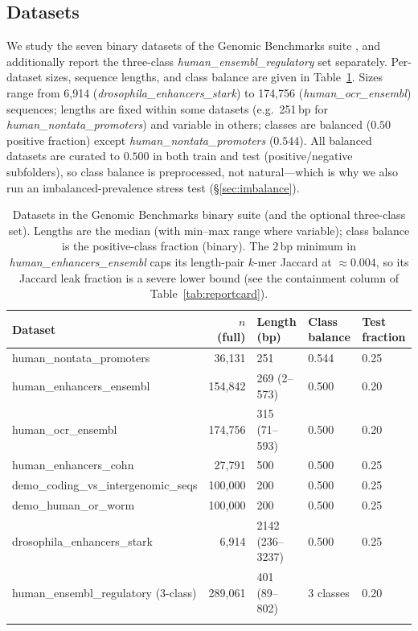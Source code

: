 \documentclass[webpdf,modern,large,namedate]{oup-authoring-template}%
\begin{document}
\subsection{Datasets}
We study the seven binary datasets of the Genomic Benchmarks suite \citep{gresova2023}, and additionally report the three-class \textit{human\_ensembl\_regulatory} set separately. Per-dataset sizes, sequence lengths, and class balance are given in Table~\ref{tab:datasets}. Sizes range from 6{,}914 (\textit{drosophila\_enhancers\_stark}) to 174{,}756 (\textit{human\_ocr\_ensembl}) sequences; lengths are fixed within some datasets (e.g.\ 251\,bp for \textit{human\_nontata\_promoters}) and variable in others; classes are balanced ($0.50$ positive fraction) except \textit{human\_nontata\_promoters} ($0.544$). All balanced datasets are curated to $0.500$ in both train and test (positive/negative subfolders), so class balance is preprocessed, not natural---which is why we also run an imbalanced-prevalence stress test (\S\ref{sec:imbalance}).

\begin{table}[tbp]
\begin{center}
\begin{minipage}{\textwidth}
\caption{Datasets in the Genomic Benchmarks binary suite (and the optional three-class set). Lengths are the median (with min--max range where variable); class balance is the positive-class fraction (binary). The $2$\,bp minimum in \textit{human\_enhancers\_ensembl} caps its length-pair $k$-mer Jaccard at $\approx0.004$, so its Jaccard leak fraction is a severe lower bound (see the containment column of Table~\ref{tab:reportcard}).\label{tab:datasets}}

\footnotesize\setlength{\tabcolsep}{5pt}\begin{tabular}{@{}lrlll@{}}
\toprule
Dataset & $n$ (full) & Length (bp) & Class balance & Test fraction\\
\midrule
human\_nontata\_promoters          & 36{,}131  & 251              & 0.544 & 0.25\\
human\_enhancers\_ensembl          & 154{,}842 & 269 (2--573)     & 0.500 & 0.20\\
human\_ocr\_ensembl                & 174{,}756 & 315 (71--593)    & 0.500 & 0.20\\
human\_enhancers\_cohn             & 27{,}791  & 500              & 0.500 & 0.25\\
demo\_coding\_vs\_intergenomic\_seqs & 100{,}000 & 200              & 0.500 & 0.25\\
demo\_human\_or\_worm               & 100{,}000 & 200              & 0.500 & 0.25\\
drosophila\_enhancers\_stark       & 6{,}914   & 2142 (236--3237) & 0.500 & 0.25\\
\midrule
human\_ensembl\_regulatory (3-class) & 289{,}061 & 401 (89--802)  & 3 classes & 0.20\\
\botrule
\end{tabular}
\end{minipage}
\end{center}
\end{table}
\end{document}
